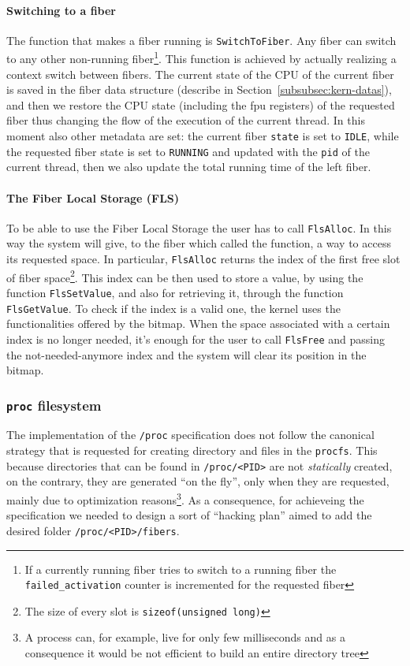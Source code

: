 \documentclass[a4paper,10pt]{article}
\begin{document}
\paragraph{Switching to a fiber}
The function that makes a fiber running is \lstinline{SwitchToFiber}. Any fiber can switch to any other non-running fiber\footnote{If a currently running fiber tries to switch to a running fiber the \lstinline{failed_activation} counter is incremented for the requested fiber}. This function is achieved by actually realizing a context switch between fibers. The current state of the CPU of the current fiber is saved in the fiber data structure (describe in Section~\ref{subsubsec:kern-datas}), and then we restore the CPU state (including the fpu registers) of the requested fiber thus changing the flow of the execution of the current thread. In this moment also other metadata are set: the current fiber \lstinline{state} is set to \texttt{IDLE}, while the requested fiber state is set to \texttt{RUNNING} and updated with the \texttt{pid} of the current thread, then we also update the total running time of the left fiber.

\paragraph{The Fiber Local Storage (FLS)}
To be able to use the Fiber Local Storage the user has to call \lstinline{FlsAlloc}. In this way the system will give, to the fiber which called the function, a way to access its requested space. In particular, \lstinline{FlsAlloc} returns the index of the first free slot of fiber space\footnote{The size of every slot is \lstinline{sizeof(unsigned long)}}. This index can be then used to store a value, by using the function \lstinline{FlsSetValue}, and also for retrieving it, through the function \lstinline{FlsGetValue}. To check if the index is a valid one, the kernel uses the functionalities offered by the bitmap. When the space associated with a certain index is no longer needed, it’s enough for the user to call \lstinline{FlsFree} and passing the not-needed-anymore index and the system will clear its position in the bitmap.

\subsubsection{\texttt{\/proc} filesystem}
The implementation of the \texttt{/proc} specification does not follow the canonical strategy that is requested for creating directory and files in the \texttt{procfs}. This because directories that can be found in \lstinline{/proc/<PID>} are not \textit{statically} created, on the contrary, they are generated ``on the fly'', only when they are requested, mainly due to optimization reasons\footnote{A process can, for example, live for only few milliseconds and as a consequence it would be not efficient to build an entire directory tree}. As a consequence, for achieveing the specification we needed to design a sort of ``hacking plan'' aimed to add the desired folder \lstinline{/proc/<PID>/fibers}.
\end{document}
